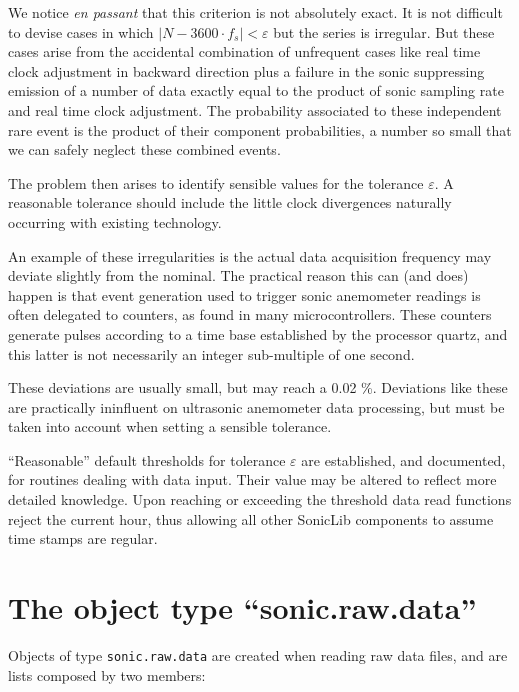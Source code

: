 \documentclass[a4paper,10pt]{book}
\begin{document}
We notice \emph{en passant} that this criterion is not absolutely exact. It is not difficult to devise cases in which $\left| N - 3600 \cdot f_{s} \right| < \varepsilon$ but the series is irregular. But these cases arise from the accidental combination of unfrequent cases like real time clock adjustment in backward direction plus a failure in the sonic suppressing emission of a number of data exactly equal to the product of sonic sampling rate and real time clock adjustment. The probability associated to these independent rare event is the product of their component probabilities, a number so small that we can safely neglect these combined events.

The problem then arises to identify sensible values for the tolerance $\varepsilon$. A reasonable tolerance should include the little clock divergences naturally occurring with existing technology.

An example of these irregularities is the actual data acquisition frequency may deviate slightly from the nominal. The practical reason this can (and does) happen is that event generation used to trigger sonic anemometer readings is often delegated to counters, as found in many microcontrollers. These counters generate pulses according to a time base established by the processor quartz, and this latter is not necessarily an integer sub-multiple of one second.

These deviations are usually small, but may reach a 0.02 \%. Deviations like these are practically ininfluent on ultrasonic anemometer data processing, but must be taken into account when setting a sensible tolerance. 

``Reasonable'' default thresholds for tolerance $\varepsilon$ are established, and documented, for routines dealing with data input. Their value may be altered to reflect more detailed knowledge. Upon reaching or exceeding the threshold data read functions reject the current hour, thus allowing all other SonicLib components to assume time stamps are regular.

\section{The object type ``sonic.raw.data''}
\label{sec:sonic.raw.data}

Objects of type \verb|sonic.raw.data| are created when reading raw data files, and are lists composed by two members:
\end{document}
